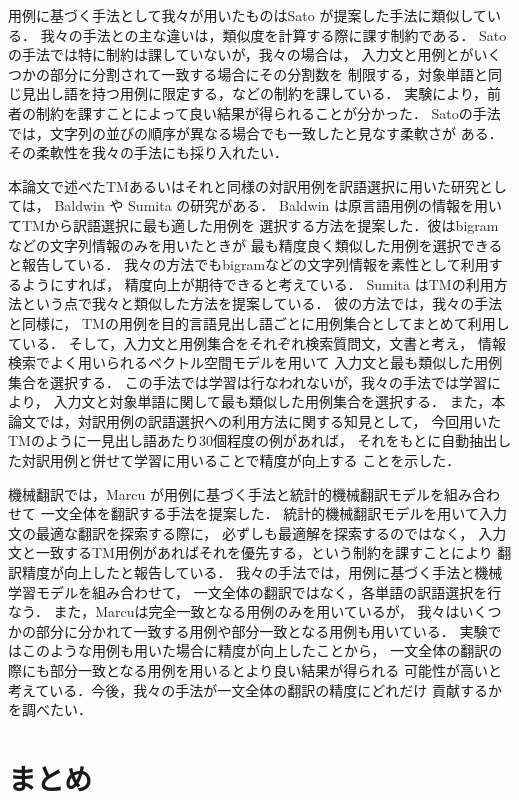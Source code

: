 用例に基づく手法として我々が用いたものはSato
\cite{Sato92} 
が提案した手法に類似している．
我々の手法との主な違いは，類似度を計算する際に課す制約である．
Satoの手法では特に制約は課していないが，我々の場合は，
入力文と用例とがいくつかの部分に分割されて一致する場合にその分割数を
制限する，対象単語と同じ見出し語を持つ用例に限定する，などの制約を課している．
実験により，前者の制約を課すことによって良い結果が得られることが分かった．
Satoの手法では，文字列の並びの順序が異なる場合でも一致したと見なす柔軟さが
ある．その柔軟性を我々の手法にも採り入れたい．

本論文で述べたTMあるいはそれと同様の対訳用例を訳語選択に用いた研究としては，
Baldwin
\cite{Baldwin:2001} 
や 
Sumita\cite{Sumita:2000} 
の研究がある．
Baldwin は原言語用例の情報を用いてTMから訳語選択に最も適した用例を
選択する方法を提案した．彼はbigramなどの文字列情報のみを用いたときが
最も精度良く類似した用例を選択できると報告している．
我々の方法でもbigramなどの文字列情報を素性として利用するようにすれば，
精度向上が期待できると考えている．
Sumita はTMの利用方法という点で我々と類似した方法を提案している．
彼の方法では，我々の手法と同様に，
TMの用例を目的言語見出し語ごとに用例集合としてまとめて利用している．
そして，入力文と用例集合をそれぞれ検索質問文，文書と考え，
情報検索でよく用いられるベクトル空間モデルを用いて
入力文と最も類似した用例集合を選択する．
この手法では学習は行なわれないが，我々の手法では学習により，
入力文と対象単語に関して最も類似した用例集合を選択する．
また，本論文では，対訳用例の訳語選択への利用方法に関する知見として，
今回用いたTMのように一見出し語あたり30個程度の例があれば，
それをもとに自動抽出した対訳用例と併せて学習に用いることで精度が向上する
ことを示した．

機械翻訳では，Marcu
\cite{Marcu:2001} 
が用例に基づく手法と統計的機械翻訳モデルを組み合わせて
一文全体を翻訳する手法を提案した．
統計的機械翻訳モデルを用いて入力文の最適な翻訳を探索する際に，
必ずしも最適解を探索するのではなく，
入力文と一致するTM用例があればそれを優先する，という制約を課すことにより
翻訳精度が向上したと報告している．
我々の手法では，用例に基づく手法と機械学習モデルを組み合わせて，
一文全体の翻訳ではなく，各単語の訳語選択を行なう．
また，Marcuは完全一致となる用例のみを用いているが，
我々はいくつかの部分に分かれて一致する用例や部分一致となる用例も用いている．
実験ではこのような用例も用いた場合に精度が向上したことから，
一文全体の翻訳の際にも部分一致となる用例を用いるとより良い結果が得られる
可能性が高いと考えている．今後，我々の手法が一文全体の翻訳の精度にどれだけ
貢献するかを調べたい．

\section{まとめ}
\label{sec:conclusion}

